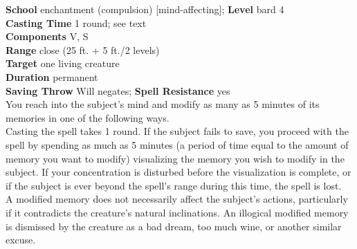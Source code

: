 \textbf{School} enchantment (compulsion) [mind-affecting]; \textbf{Level} bard 4\\
\textbf{Casting Time} 1 round; see text\\
\textbf{Components} V, S\\
\textbf{Range} close (25 ft. + 5 ft./2 levels)\\
\textbf{Target} one living creature\\
\textbf{Duration} permanent\\
\textbf{Saving Throw }Will negates; \textbf{Spell Resistance} yes\\
You reach into the subject's mind and modify as many as 5 minutes of its memories in one of the following ways.\\
Casting the spell takes 1 round. If the subject fails to save, you proceed with the spell by spending as much as 5 minutes (a period of time equal to the amount of memory you want to modify) visualizing the memory you wish to modify in the subject. If your concentration is disturbed before the visualization is complete, or if the subject is ever beyond the spell's range during this time, the spell is lost.\\
A modified memory does not necessarily affect the subject's actions, particularly if it contradicts the creature's natural inclinations. An illogical modified memory is dismissed by the creature as a bad dream, too much wine, or another similar excuse. \\
